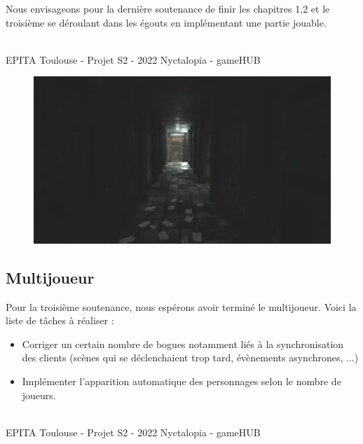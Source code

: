 Nous envisageons pour la dernière soutenance de finir les chapitres 1,2 et le troisième se déroulant dans les égouts en implémentant une partie jouable.




\vfill
\noindent\makebox[\linewidth]{\rule{.8\paperwidth}{.6pt}}\\[0.2cm]
EPITA Toulouse - Projet S2 - 2022 \hfill Nyctalopia - gameHUB
\noindent\makebox[\linewidth]{\rule{.8\paperwidth}{.6pt}}

\newpage

\begin{figure}[H]
\centering
\begin{minipage}{.7\textwidth}
  \centering
  \centerline{\includegraphics[width=.5\linewidth]{img/assets/egouts3.png}}
  \label{fig:egouts3}
\end{minipage}%
\end{figure}

\subsection{Multijoueur}
Pour la troisième soutenance, nous espérons avoir terminé le multijoueur. Voici la liste de tâches à réaliser :
\begin{itemize}
    \item Corriger un certain nombre de bogues notamment liés à la synchronisation des clients (scènes qui se déclenchaient trop tard, évènements asynchrones, ...)
    \item Implémenter l'apparition automatique des personnages selon le nombre de joueurs.
\end{itemize}



\vfill
\noindent\makebox[\linewidth]{\rule{.8\paperwidth}{.6pt}}\\[0.2cm]
EPITA Toulouse - Projet S2 - 2022 \hfill Nyctalopia - gameHUB
\noindent\makebox[\linewidth]{\rule{.8\paperwidth}{.6pt}}

\newpage